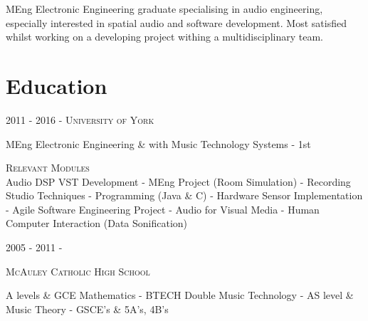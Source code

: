\documentclass[10pt]{article}
\begin{document}
\hfill
\begin{minipage}[t]{0.74\textwidth} %

    
    \vspace{5mm}
    
    \justify MEng Electronic Engineering graduate specialising in audio engineering, especially interested in spatial audio and software development. Most satisfied whilst working on a developing project withing a multidisciplinary team.

    \section{Education}
    
    \begin{center}
    \color{headings}\hlarge\textsc{2011 - 2016} - {\textsc{University of York}}\\
    \vspace{5pt}
    \normalsize\normalcolor

    MEng Electronic Engineering \& with Music Technology Systems - 1{st}
    \vspace{5pt}
    
    \textsc{Relevant Modules}\\
    \vspace{5pt}
    Audio DSP VST Development - MEng Project (Room Simulation) - Recording Studio Techniques - Programming (Java \& C) - Hardware Sensor Implementation - Agile Software Engineering Project - Audio for Visual Media - Human Computer Interaction (Data Sonification) 

    \vspace{5pt}
    \color{headings}\hlarge\textsc{2005 - 2011} - {\textsc{McAuley Catholic High School}\par}
    \vspace{5pt}
    \normalsize\normalcolor
	A levels \& GCE Mathematics - BTECH Double Music Technology - AS level \& Music Theory - GSCE's \& 5A's, 4B's
	\end{center}

	\vspace{5mm}


\end{minipage}
\end{document}
